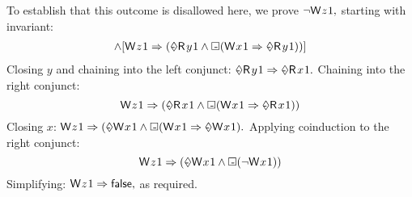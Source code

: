 \begin{example}
To establish that this outcome is disallowed here, we prove 
\begin{math}
  \lnot\DW{z}{1},
\end{math}
starting with invariant:
\begin{align*}
  [\once\DW{y}{1} \Rightarrow \once\DR{x}{1}]
  \land
  [\notonce\DW{z}{1} \Rightarrow (\once\DR{y}{1} \land \always(\DW{x}{1} \Rightarrow \once\DR{y}{1}))]
\end{align*}
Closing $y$ and chaining into the left conjunct:
\begin{math}
  \once\DR{y}{1} \Rightarrow \once\DR{x}{1}.
\end{math}
Chaining into the right conjunct:
\begin{displaymath}
  \notonce\DW{z}{1} \Rightarrow (\once\DR{x}{1} \land \always(\DW{x}{1} \Rightarrow \once\DR{x}{1}))
\end{displaymath}
Closing $x$:
\begin{math}
  \notonce\DW{z}{1} \Rightarrow (\once\DW{x}{1} \land \always(\DW{x}{1} \Rightarrow \once\DW{x}{1}).
\end{math}
Applying coinduction to the right conjunct:
\begin{displaymath}
  \notonce\DW{z}{1} \Rightarrow (\once\DW{x}{1} \land \always(\lnot \DW{x}{1}))
\end{displaymath}
Simplifying:
\begin{math}
  \notonce\DW{z}{1} \Rightarrow \FALSE,
\end{math}
as required.
\end{example}


